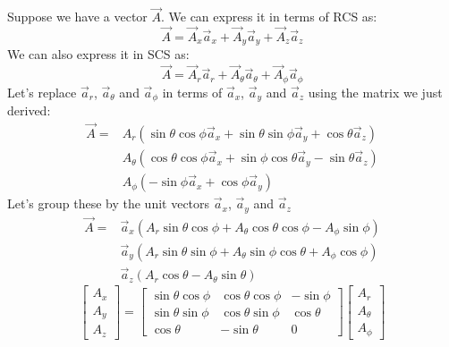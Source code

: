             Suppose we have a vector $\vec{A}$. We can express it in terms of RCS as:
            $$\vec{A} = \vec{A}_x\vec{a}_x + \vec{A}_y\vec{a}_y + \vec{A}_z\vec{a}_z$$
            We can also express it in SCS as:
            $$\vec{A} = \vec{A}_r\vec{a}_r + \vec{A}_\theta\vec{a}_\theta + \vec{A}_\phi\vec{a}_\phi$$
            Let's replace $\vec{a}_r$, $\vec{a}_\theta$ and $\vec{a}_\phi$ in terms of $\vec{a}_x$, $\vec{a}_y$ and $\vec{a}_z$ using the matrix we just derived:
            \begin{align*}
                \vec{A} = & A_r\left(\sin\theta\cos\phi\vec{a}_x + \sin\theta\sin\phi\vec{a}_y + \cos\theta\vec{a}_z\right) \\
                & A_\theta\left(\cos\theta\cos\phi\vec{a}_x + \sin\phi\cos\theta\vec{a}_y -\sin\theta\vec{a}_z\right) \\ 
                & A_\phi\left(-\sin\phi\vec{a}_x + \cos\phi\vec{a}_y\right)
            \end{align*}
            Let's group these by the unit vectors $\vec{a}_x$, $\vec{a}_y$ and $\vec{a}_z$
            \begin{align*}
                \vec{A} = & \vec{a}_x \left(A_r\sin\theta\cos\phi + A_\theta\cos\theta\cos\phi - A_\phi\sin\phi\right)\\
                & \vec{a}_y \left(A_r\sin\theta\sin\phi + A_\theta\sin\phi\cos\theta + A_\phi\cos\phi\right) \\
                & \vec{a}_z \left(A_r\cos\theta - A_\theta\sin\theta\right)
            \end{align*}
            \begin{equation}
                \begin{bmatrix}
                    A_x \\ A_y \\ A_z    
                \end{bmatrix}
                =
                \begin{bmatrix}
                    \sin\theta\cos\phi & \cos\theta\cos\phi & -\sin\phi \\
                    \sin\theta\sin\phi & \cos\theta\sin\phi & \cos\theta \\
                    \cos\theta & -\sin\theta & 0
                \end{bmatrix}
                \begin{bmatrix}
                    A_r \\ A_\theta \\ A_\phi
                \end{bmatrix}
            \end{equation}
